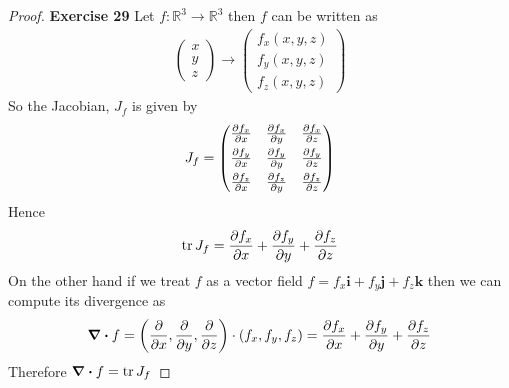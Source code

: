 \documentclass[11pt]{article}
\newcommand{\R}{\mathbb{R}}
\newcommand{\uvi}{\bm{i}}
\newcommand{\uvj}{\bm{j}}
\newcommand{\uvk}{\bm{k}}
\theoremstyle{definition}
\begin{document}
\begin{proof}{\textbf{Exercise 29}}
    Let $f:\R^3 \to \R^3$ then $f$ can be written as 
    \begin{align*}
        \begin{pmatrix} x \\ y \\ z \end{pmatrix}
        \to \begin{pmatrix} f_x(x,y,z)\\ f_y(x,y,z)\\ f_z(x,y,z) \end{pmatrix}
    \end{align*}
    So the Jacobian, $J_f$ is given by
    \begin{align*}
        J_f = \begin{pmatrix}
            \pdv{f_x}{x} & \pdv{f_x}{y} & \pdv{f_x}{z}\\[1ex]
            \pdv{f_y}{x} & \pdv{f_y}{y} & \pdv{f_y}{z}\\[1ex]
            \pdv{f_z}{x} & \pdv{f_z}{y} & \pdv{f_z}{z}
        \end{pmatrix}
    \end{align*}
    Hence
    $$\tr J_f = \pdv{f_x}{x} + \pdv{f_y}{y} +\pdv{f_z}{z}$$
    On the other hand if we treat $f$ as a vector field
    $f = f_x \uvi + f_y \uvj + f_z \uvk$ then we can compute its divergence
    as
    \begin{align*}
        \div{f} = \left(\pdv{x}, \pdv{y}, \pdv{z}\right)\cdot (f_x, f_y, f_z)
        = \pdv{f_x}{x} + \pdv{f_y}{y} +\pdv{f_z}{z}
    \end{align*}
    Therefore $\div{f} = \tr J_f$
\end{proof}
\end{document}
